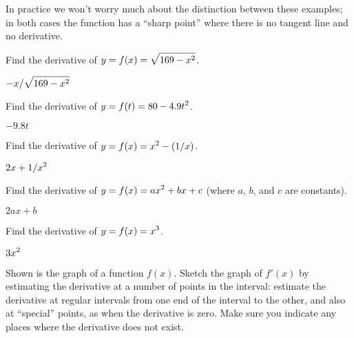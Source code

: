 In practice we won't worry much about the distinction between these
examples; in both cases the function has a ``sharp point'' where there
is no tangent line and no derivative.

\begin{exercises}

\exercise
Find the derivative of $\displaystyle y=f(x)=\sqrt{169-x^2}$.
\begin{answer} $\displaystyle -x/\sqrt{169-x^2}$
\end{answer}

\exercise
Find the derivative of $\displaystyle y=f(t)=80-4.9t^2$.
\begin{answer} $-9.8t$
\end{answer}

\exercise
Find the derivative of $\displaystyle y=f(x)=x^2-(1/x)$.
\begin{answer} $\displaystyle 2x+1/x^2$
\end{answer}

\exercise
Find the derivative of $\displaystyle y=f(x)=
ax^2+bx+c$ (where $a$, $b$, and $c$ are constants).
\begin{answer} $2ax+b$
\end{answer}

\exercise
Find the derivative of $\displaystyle y=f(x)=x^3$.
\begin{answer} $\displaystyle 3x^2$
\end{answer}

\exercise
Shown is the graph of a function $f(x)$. Sketch the graph of $f'(x)$
by estimating the derivative at a number of points in the interval:
estimate the derivative at regular intervals from one end of the
interval to the other, and also at ``special'' points, as when the
derivative is zero. Make sure you indicate any places where the
derivative does not exist.


\end{exercises}
